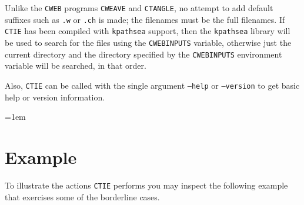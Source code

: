 \documentclass{article}
\let\mc=\small
\let\.=\texttt
\begin{document}
Unlike the \.{CWEB} programs \.{CWEAVE} and \.{CTANGLE}, no attempt to
add default suffixes such as \.{.w} or \.{.ch} is made; the filenames
must be the full filenames.  If \.{CTIE} has been compiled with
\.{kpathsea} support, then the \.{kpathsea} library will be used to
search for the files using the \.{CWEBINPUTS} variable, otherwise just
the current directory and the directory specified by the
\.{CWEBINPUTS} environment variable will be searched, in that order.

Also, \.{CTIE} can be called with the single argument \.{--help} or
\.{--version} to get basic help or version information.

\clearpage


\def\eof{$\langle$\textrm{\mc EOF}$\rangle$}
\tabcolsep=1em
\parindent=0pt

\section{Example}

To illustrate the actions \.{CTIE} performs you may inspect the
following example that exercises some of the borderline cases.
\end{document}
